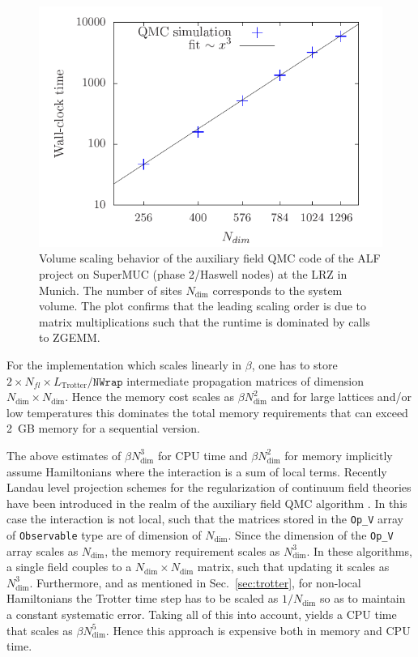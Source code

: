\begin{figure}[h]
	\begin{center}
		\includegraphics[scale=.8]{Size_scaling_ALF_2.pdf}
	\end{center}
	\caption{\label{fig_scaling_size}Volume scaling behavior of the auxiliary field QMC code of the ALF project on SuperMUC (phase 2/Haswell nodes) at the LRZ in Munich. The number of sites $N_{\text{dim}}$ corresponds to the system volume.
	The plot confirms that the leading scaling order is due to matrix multiplications such that the runtime is dominated by calls to ZGEMM. }
\end{figure}

For the implementation which scales linearly in $\beta$, one has to store $2\times N_{fl} \times L_{\text{Trotter}}/\texttt{NWrap}$ intermediate propagation matrices of dimension $N_{\text{dim}}\times N_{\text{dim}}$.   
Hence the memory cost scales as $ \beta N_{\text{dim}}^2$ and for  large lattices and/or low temperatures this dominates the total memory requirements that can exceed 2~GB memory for a sequential version.   

The above estimates of $\beta N_{\text{dim}}^3 $ for CPU time and $\beta N_{\text{dim}}^2 $ for memory implicitly assume Hamiltonians where the interaction  is a sum of local terms.  
Recently  Landau level projection schemes for the   regularization of continuum field theories have been introduced in the realm of the auxiliary field QMC algorithm  \cite{Ippoliti18,WangZ20}. In  this case the interaction is not local,  such that the matrices stored in  the   \texttt{Op\_V} array  of \texttt{Observable} type   are of dimension of $N_{\text{dim}}$. Since the  dimension of the  \texttt{Op\_V}   array scales as $N_{\text{dim}}$, the memory  requirement scales as $N_{\text{dim}}^3$.    In these algorithms, a single field couples to a $N_{\text{dim}} \times  N_{\text{dim}} $ matrix, such that updating  it scales as $ N_{\text{dim}}^3$.  Furthermore, and as mentioned in Sec.~\ref{sec:trotter}, for non-local  Hamiltonians the  Trotter time step has to be scaled   as $1/N_{\text{dim}}$ so as to maintain a constant systematic error.  Taking all of this into account,    yields a CPU time that scales as $\beta N_{\text{dim}}^5$.    Hence  this approach  is expensive both in memory and CPU time. 

